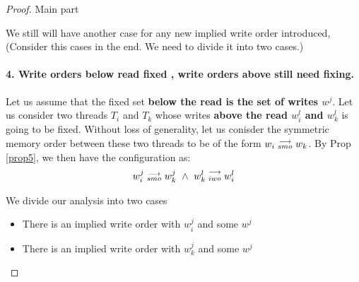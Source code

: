 \begin{proof}{Main part}
\begin{itemize}
\begin{itemize}
                        \end{itemize}

                \end{itemize}
            
            We still will have another case for any new implied write order introduced, (Consider this cases in the end. We need to divide it into two cases.)
            \paragraph{4. Write orders below read fixed , write orders above still need fixing.} 
                Let us assume that the fixed set \textbf{below the read is the set of writes $w^j$}. Let us consider two threads $T_i$ and $T_k$ whose writes \textbf{above the read $w_i^l$ and $w_k^l$} is going to be fixed. Without loss of generality, let us conisder the symmetric memory order between these two threads to be of the form $w_i\stackrel{\longrightarrow}{_{smo}}w_k$.  By Prop \ref{prop5}, we then have the configuration as:
                \begin{align*}
                    \reln{w_i^j}{smo}{w_k^j} \ \wedge \ \reln{w_k^l}{iwo}{w_i^l}
                \end{align*}

                We divide our analysis into two cases 
                \begin{itemize}
                    \item There is an implied write order with $w_i^j$ and some $w^j$
                    \item There is an implied write order with $w_k^j$ and some $w^j$
                \end{itemize}

        \end{proof}

